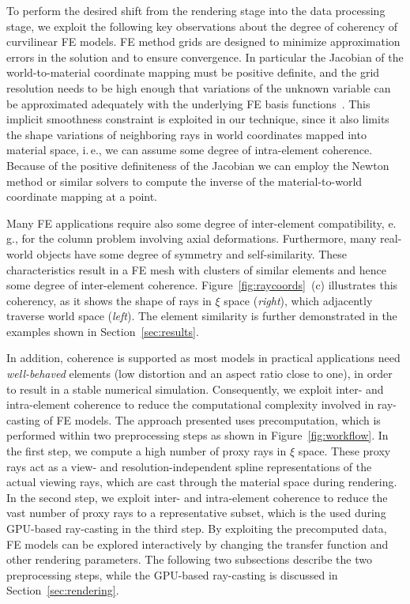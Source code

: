 \documentclass[journal]{vgtc}                %
\begin{document}
To perform the desired shift from the rendering stage into the data processing stage, we exploit the following key observations about the degree of coherency of curvilinear FE models. FE method grids are designed to minimize approximation errors in the solution and to ensure convergence. In particular the Jacobian of the world-to-material coordinate mapping must be positive definite, and the grid resolution needs to be high enough that variations of the unknown variable can be approximated adequately with the underlying FE basis functions~\cite{knupp07meshquality}. This implicit smoothness constraint is exploited in our technique, since it also limits the shape variations of neighboring rays in world coordinates mapped into material space, i.\,e., we can assume some degree of intra-element coherence. Because of the positive definiteness of the Jacobian we can employ the Newton method or similar solvers to compute the inverse of the material-to-world coordinate mapping at a point.

Many FE applications require also some degree of inter-element compatibility, e.\,g., for the column problem involving axial deformations. Furthermore, many real-world objects have some degree of symmetry and self-similarity. These characteristics result in a FE mesh with clusters of similar elements and hence some degree of inter-element coherence. Figure~\ref{fig:raycoords}~(c) illustrates this coherency, as it shows the shape of rays in $\xi$ space ({\it right}), which adjacently traverse world space ({\it left}). The element similarity is further demonstrated in the examples shown in Section~\ref{sec:results}.

\noindent In addition, coherence is supported as most models in practical applications need {\it well-behaved} elements (low distortion and an aspect ratio close to one), in order to result in a stable numerical simulation. Consequently, we exploit inter- and intra-element coherence to reduce the computational complexity involved in ray-casting of FE models. The approach presented uses precomputation, which is performed within two preprocessing steps as shown in Figure~\ref{fig:workflow}. In the first step, we compute a high number of proxy rays in $\xi$ space. These proxy rays act as a view- and resolution-independent spline representations of the actual viewing rays, which are cast through the material space during rendering. In the second step, we exploit inter- and intra-element coherence to reduce the vast number of proxy rays to a representative subset, which is the used during GPU-based ray-casting in the third step. By exploiting the precomputed data, FE models can be explored interactively by changing the transfer function and other rendering parameters. The following two subsections describe the two preprocessing steps, while the GPU-based ray-casting is discussed in Section~\ref{sec:rendering}.
\end{document}
